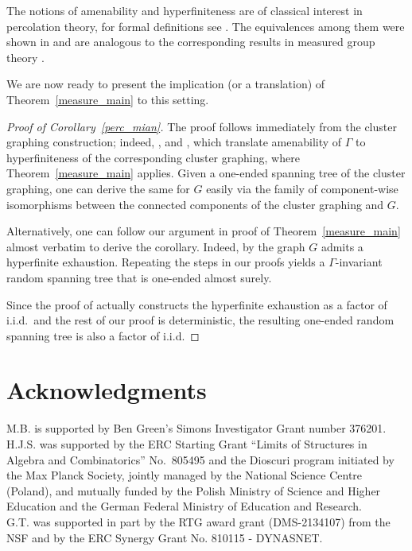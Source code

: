 \documentclass[letterpaper,11pt,reqno]{amsart}
\theoremstyle{bfnote}
\theoremstyle{definition}
\newcommand{\0}{\varnothing}
\newcommand{\red}[1]{{\color{red}#1}}
\newcommand{\todo}[1]{\red{\textbf{\upshape{[#1]}}}}
\numberwithin{equation}{section}
\begin{document}
The notions of amenability and hyperfiniteness are of classical interest in percolation theory, for formal definitions see \cite{BSbeyond,BLPS99inv,URG,wamen}. The equivalences among them were shown in \cite{BLPS99inv} and are analogous to the corresponding results in measured group theory \cite{cfw,kaimanovich1997amenability}.


We are now ready to present the implication (or a translation) of Theorem~\ref{measure_main} to this setting.
\begin{proof}[Proof of Corollary~\ref{perc_mian}]
    The proof follows immediately from the cluster graphing construction; indeed, \cite[Theorem 3.9]{BLPS99inv}, and \cite[Theorem 1.4 and Lemma 4.2]{wamen}, which translate amenability of $\Gamma$ to hyperfiniteness of the corresponding cluster graphing, where Theorem~\ref{measure_main} applies. 
    Given a one-ended spanning tree of the cluster graphing, one can derive the same for $G$ easily via the family of component-wise isomorphisms between the connected components of the cluster graphing and $G$.
    
    Alternatively, one can follow our argument in proof of Theorem~\ref{measure_main} almost verbatim to derive the corollary. Indeed, by \cite[Theorem 5.1]{BLPS99inv} the graph $G$ admits a hyperfinite exhaustion. Repeating the steps in our proofs yields a $\Gamma$-invariant random spanning tree that is one-ended almost surely.

    Since the proof of \cite[Theorem 5.1]{BLPS99inv} actually constructs the hyperfinite exhaustion as a factor of i.i.d.\ and the rest of our proof is deterministic, the resulting one-ended random spanning tree is also a factor of i.i.d.
\end{proof}

\section*{Acknowledgments}

M.B. is supported by Ben Green's Simons Investigator Grant number 376201.\\
H.J.S. was supported by the ERC Starting Grant “Limits of Structures in Algebra and Combinatorics” No.~805495 and the Dioscuri program initiated by the Max Planck Society, jointly managed by the National Science Centre (Poland), and mutually funded by the Polish Ministry of Science and Higher Education and the German Federal Ministry of Education and Research.\\
G.T. was supported in part by the RTG award grant (DMS-2134107) from the NSF and by the ERC Synergy Grant No. 810115 - DYNASNET. 
 
 
\end{document}
